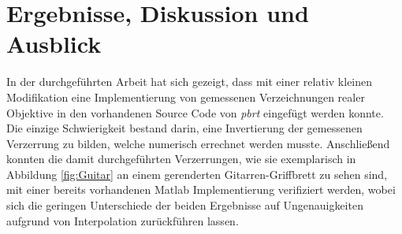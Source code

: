 \section{Ergebnisse, Diskussion und Ausblick}
In der durchgeführten Arbeit hat sich gezeigt, dass mit einer relativ kleinen Modifikation eine Implementierung von gemessenen Verzeichnungen realer Objektive in den vorhandenen Source Code von \textit{pbrt} eingefügt werden konnte. Die einzige Schwierigkeit bestand darin, eine Invertierung der gemessenen Verzerrung zu bilden, welche numerisch errechnet werden musste. Anschließend konnten die damit durchgeführten Verzerrungen, wie sie exemplarisch in Abbildung \ref{fig:Guitar} an einem gerenderten Gitarren-Griffbrett zu sehen sind, mit einer bereits vorhandenen Matlab Implementierung verifiziert werden, wobei sich die geringen Unterschiede der beiden Ergebnisse auf Ungenauigkeiten aufgrund von Interpolation zurückführen lassen.\\


